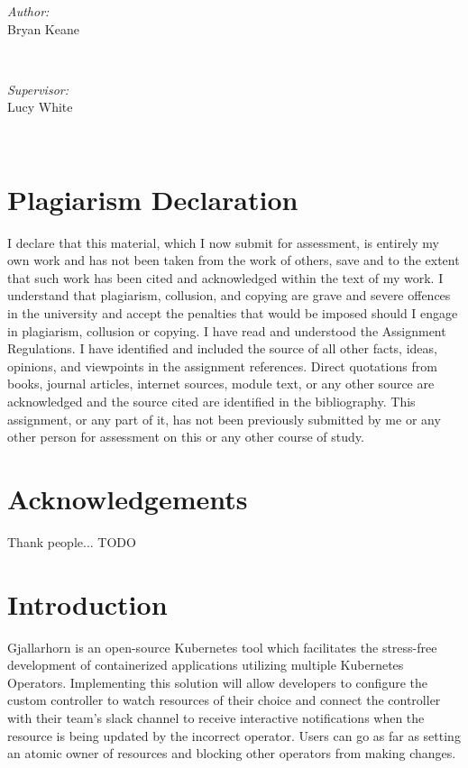 \documentclass{article}
\begin{document}
\begin{titlepage}
    \begin{minipage}{0.4\textwidth}
    \begin{flushleft} \large
    \emph{Author:}\\
    Bryan Keane 
    \end{flushleft}
    \end{minipage}
    ~
    \begin{minipage}{0.4\textwidth}
    \begin{flushright} \large
    \emph{Supervisor:} \\
    Lucy White
    \end{flushright}
    \end{minipage}\\[2cm]
    
    \end{titlepage}

\newpage

\tableofcontents
\newpage

\listoffigures
\newpage

\listoftables
\newpage

\section{Plagiarism Declaration}
I declare that this material, which I now submit for assessment, is entirely my own work and has not been taken from the work of others, save and to the extent that such work has been cited and acknowledged within the text of my work. I understand that plagiarism, collusion, and copying are grave and severe offences in the university and accept the penalties that would be imposed should I engage in plagiarism, collusion or copying. I have read and understood the Assignment Regulations. I have identified and included the source of all other facts, ideas, opinions, and viewpoints in the assignment references. Direct quotations from books, journal articles, internet sources, module text, or any other source are acknowledged and the source cited are identified in the bibliography. This assignment, or any part of it, has not been previously submitted by me or any other person for assessment on this or any other course of study.  

\newpage
\section{Acknowledgements}
Thank people... TODO

\newpage
\section{Introduction}
Gjallarhorn is an open-source Kubernetes tool which facilitates the stress-free development of containerized applications utilizing multiple Kubernetes Operators. Implementing this solution will allow developers to configure the custom controller to watch resources of their choice and connect the controller with their team’s slack channel to receive interactive notifications when the resource is being updated by the incorrect operator. Users can go as far as setting an atomic owner of resources and blocking other operators from making changes.
\end{document}
